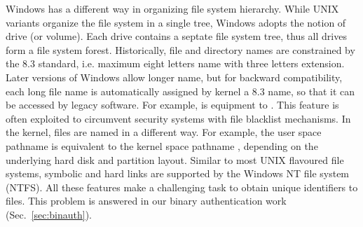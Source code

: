 Windows has a different way in organizing file system hierarchy.
While UNIX variants organize the file system in a single tree,
Windows adopts the notion of drive (or volume).
Each drive contains a septate file system tree, thus all drives
form a file system forest.
Historically, file and directory names are constrained by the 8.3
standard,
i.e. maximum eight letters name with three letters extension.
Later versions of Windows allow longer name, but for backward
compatibility, each long file name is automatically assigned by kernel a
8.3 name, so that it can be accessed by legacy software.
For example,  is equipment to .
This feature is often exploited to circumvent security systems with
file blacklist mechanisms.
In the kernel, files are named in a different way.
For example, the user space pathname 
is equivalent to the kernel space pathname
,
depending on the underlying hard disk and partition layout.
Similar to most UNIX flavoured file systems, symbolic and hard links
are supported by the Windows NT file system (NTFS).
All these features make a challenging task to obtain unique identifiers to files.
This problem is answered in our binary authentication work (Sec.~\ref{sec:binauth}).

